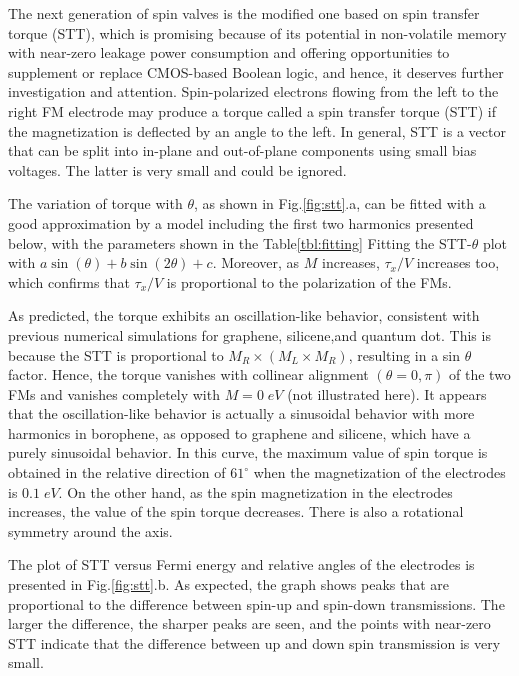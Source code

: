 \documentclass[twoside,twocolumn,9pt]{article}
\begin{document}
The next generation of spin valves is the modified one based on spin transfer torque (STT), which is promising because of its potential in non-volatile memory with near-zero leakage power consumption and offering opportunities to supplement or replace CMOS-based Boolean logic, and hence, it deserves further investigation and attention. Spin-polarized electrons flowing from the left to the right FM electrode may produce a torque called a spin transfer torque (STT) if the magnetization is deflected by an angle to the left. In general, STT is a vector that can be split into in-plane and out-of-plane components using small bias voltages. The latter is very small and could be ignored.

The variation of torque with $\theta$, as shown in Fig.\ref{fig:stt}.a, can be fitted with a good approximation by a model including the first two harmonics presented below, with the parameters shown in the Table\ref{tbl:fitting} Fitting the STT-$\theta$ plot with $a\sin(\theta)+b\sin(2\theta)+c$. Moreover, as $M$ increases, $\tau_x/V$ increases too, which confirms that $\tau_x/V$ is proportional to the polarization of the FMs.

As predicted, the torque exhibits an oscillation-like behavior, consistent with previous numerical simulations for graphene\cite{maher2022spin}, silicene\cite{cheraghchi2012edge},and quantum dot\cite{pham2020electronic}. This is because the STT is proportional to $M_R\times (M_L\times M_R)$, resulting in a sin $\theta$ factor. Hence, the torque vanishes with collinear alignment $(\theta = 0,\pi)$ of the two FMs and vanishes completely with $M = 0\;eV$ (not illustrated here). It appears that the oscillation-like behavior is actually a sinusoidal behavior with more harmonics in borophene, as opposed to graphene and silicene, which have a purely sinusoidal behavior.
In this curve, the maximum value of spin torque is obtained in the relative direction of $61^\circ$ when the magnetization of the electrodes is $0.1\;eV$. On the other hand, as the spin magnetization in the electrodes increases, the value of the spin torque decreases. There is also a rotational symmetry around the axis.

The plot of STT versus Fermi energy and relative angles of the electrodes is presented in Fig.\ref{fig:stt}.b. As expected, the graph shows peaks that are proportional to the difference between spin-up and spin-down transmissions. The larger the difference, the sharper peaks are seen, and the points with near-zero STT indicate that the difference between up and down spin transmission is very small. 
\end{document}
